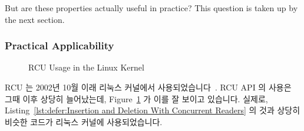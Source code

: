 But are these properties actually useful in practice?
This question is taken up by the next section.

\subsubsection{Practical Applicability}
\label{sec:defer:Practical Applicability}

\begin{figure}[tb]
\centering
{}
\caption{RCU Usage in the Linux Kernel}
\label{fig:defer:RCU Usage in the Linux Kernel}
\end{figure}

RCU 는 2002년 10월 이래 리눅스 커널에서 사용되었습니다~\cite{Torvalds2.5.43}.
RCU API 의 사용은 그때 이후 상당히 늘어났는데,
Figure~\ref{fig:defer:RCU Usage in the Linux Kernel} 가 이를 잘 보이고
있습니다.
실제로,
Listing~\ref{lst:defer:Insertion and Deletion With Concurrent Readers}
의 것과 상당히 비슷한 코드가 리눅스 커널에 사용되었습니다.

